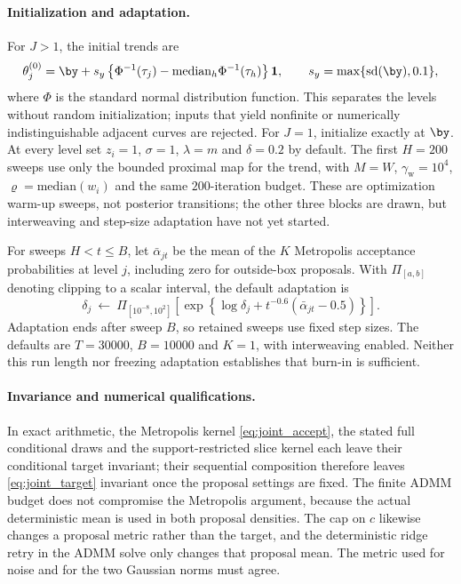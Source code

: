 \paragraph{Initialization and adaptation.} For $J>1$, the initial trends are
\[
    \theta_j^{(0)}=\by+s_y\left\{\Phi^{-1}(\tau_j)
                -\mathrm{median}_{h}\Phi^{-1}(\tau_h)\right\}\mathbf 1,
    \qquad s_y=\max\{\mathrm{sd}(\by),0.1\},
\]
where $\Phi$ is the standard normal distribution function. This separates the levels without random initialization; inputs that yield nonfinite or numerically indistinguishable adjacent curves are rejected. For $J=1$, initialize exactly at $\by$. At every level set $z_i=1$, $\sigma=1$, $\lambda=m$ and $\delta=0.2$ by default. The first $H=200$ sweeps use only the bounded proximal map for the trend, with $M=W$, $\gamma_{\mathrm w}=10^4$, $\varrho=\mathrm{median}(w_i)$ and the same $200$-iteration budget. These are optimization warm-up sweeps, not posterior transitions; the other three blocks are drawn, but interweaving and step-size adaptation have not yet started.

For sweeps $H<t\leq B$, let $\bar\alpha_{jt}$ be the mean of the $K$ Metropolis acceptance probabilities at level $j$, including zero for outside-box proposals. With $\Pi_{[a,b]}$ denoting clipping to a scalar interval, the default adaptation is
\[
    \delta_j\ \leftarrow\ \Pi_{[10^{-8},10^2]}
        \left[\exp\left\{\log\delta_j+t^{-0.6}(\bar\alpha_{jt}-0.5)\right\}\right].
\]
Adaptation ends after sweep $B$, so retained sweeps use fixed step sizes. The defaults are $T=30000$, $B=10000$ and $K=1$, with interweaving enabled. Neither this run length nor freezing adaptation establishes that burn-in is sufficient.

\paragraph{Invariance and numerical qualifications.} In exact arithmetic, the Metropolis kernel \eqref{eq:joint_accept}, the stated full conditional draws and the support-restricted slice kernel each leave their conditional target invariant; their sequential composition therefore leaves \eqref{eq:joint_target} invariant once the proposal settings are fixed. The finite ADMM budget does not compromise the Metropolis argument, because the actual deterministic mean is used in both proposal densities. The cap on $c$ likewise changes a proposal metric rather than the target, and the deterministic ridge retry in the ADMM solve only changes that proposal mean. The metric used for noise and for the two Gaussian norms must agree.

